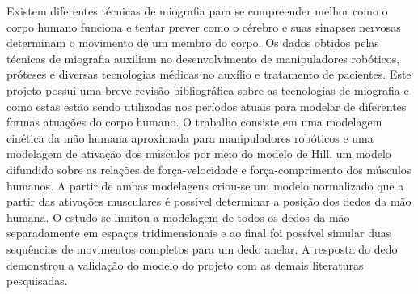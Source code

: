 Existem diferentes técnicas de miografia para se compreender melhor como o corpo humano funciona e tentar prever como o cérebro e suas sinapses nervosas determinam o movimento de um membro do corpo. Os dados obtidos pelas técnicas de miografia auxiliam no desenvolvimento de manipuladores robóticos, próteses e diversas tecnologias médicas no auxílio e tratamento de pacientes. Este projeto possui uma breve revisão bibliográfica sobre as tecnologias de miografia e como estas estão sendo utilizadas nos períodos atuais para modelar de diferentes formas atuações do corpo humano. O trabalho consiste em uma modelagem cinética da mão humana aproximada para manipuladores robóticos e uma modelagem de ativação dos músculos por meio do modelo de Hill, um modelo difundido sobre as relações de força-velocidade e força-comprimento dos músculos humanos. A partir de ambas modelagens criou-se um modelo normalizado que a partir das ativações musculares é possível determinar a posição dos dedos da mão humana. O estudo se limitou a modelagem de todos os dedos da mão separadamente em espaços tridimensionais e ao final foi possível simular duas sequências de movimentos completos para um dedo anelar. A resposta do dedo demonstrou a validação do modelo do projeto com as demais literaturas pesquisadas. 




\clearpage
\renewcommand*\listfigurename{Lista de Ilustrações}

